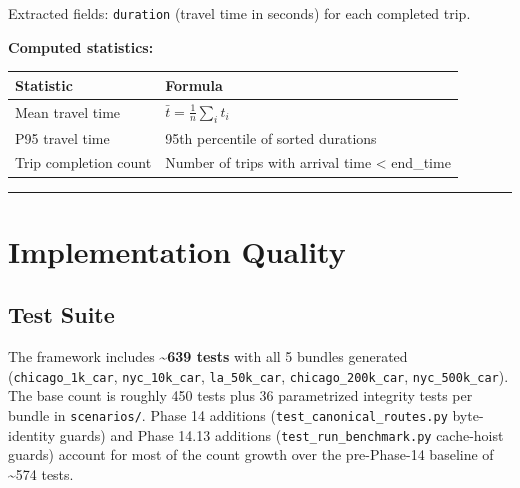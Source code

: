 Extracted fields: \texttt{duration} (travel time in seconds) for each
completed trip.

\textbf{Computed statistics:}

\begin{longtable}[]{@{}ll@{}}
\toprule\noalign{}
Statistic & Formula \\
\midrule\noalign{}
\endhead
\bottomrule\noalign{}
\endlastfoot
Mean travel time & \(\bar{t} = \frac{1}{n}\sum_i t_i\) \\
P95 travel time & 95th percentile of sorted durations \\
Trip completion count & Number of trips with arrival time \textless{}
end\_time \\
\end{longtable}

\begin{center}\rule{0.5\linewidth}{0.5pt}\end{center}

\section{Implementation Quality}\label{37-implementation-quality}

\subsection{Test Suite}\label{371-test-suite}

The framework includes \textbf{\textasciitilde639 tests} with all 5
bundles generated (\texttt{chicago\_1k\_car}, \texttt{nyc\_10k\_car},
\texttt{la\_50k\_car}, \texttt{chicago\_200k\_car},
\texttt{nyc\_500k\_car}). The base count is roughly 450 tests plus 36
parametrized integrity tests per bundle in \texttt{scenarios/}. Phase 14
additions (\texttt{test\_canonical\_routes.py} byte-identity guards) and
Phase 14.13 additions (\texttt{test\_run\_benchmark.py} cache-hoist
guards) account for most of the count growth over the pre-Phase-14
baseline of \textasciitilde574 tests.

